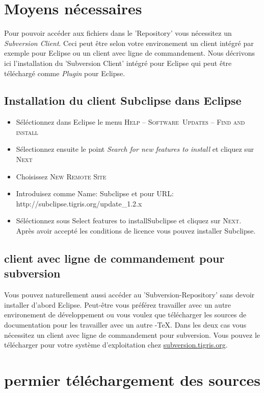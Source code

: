 \section{Moyens nécessaires}
Pour pouvoir accéder aux fichiers dans le 'Repository' vous nécessitez un \textit{Subversion Client}. Ceci peut être selon votre environement un client intégré par exemple pour Eclipse ou un client avec ligne de commandement. Nous décrivons ici l'installation du 'Subversion Client' intégré pour Eclipse qui peut être téléchargé comme \textit{Plugin} pour Eclipse.
\subsection{Installation du client Subclipse dans Eclipse}
\label{subclipse}
\begin{itemize}
  \item Séléctionnez dans Eclipse le menu \textsc{Help -- Software~Updates -- Find
  and install}
  \item Sélectionnez ensuite le point \textit{Search for new features to install} et cliquez sur \textsc{Next}
  \item Choisissez \textsc{New Remote Site}
  \item Introduisez comme \glq Name\grq : Sub\-clipse et pour \glq URL\grq:
  http://subclipse.tigris.org/update\_1.2.x
  \item Séléctionnez sous \glqq Select features to install\grqq Subclipse et cliquez sur \textsc{Next}. Après avoir accepté les conditions de licence vous pouvez installer Subclipse.

\end{itemize}
\subsection{client avec ligne de commandement pour subversion}
\label{subversionclient}
Vous pouvez naturellement aussi accéder au 'Subversion-Repository' sans devoir installer d'abord Eclipse. Peut-être vous préférez travailler avec un autre environement de développement ou vous voulez que télécharger les sources de documentation pour les travailler avec un autre \Instrument-TeX. Dans les deux cas vous nécessitez un client avec ligne de commandement pour subversion. Vous pouvez le télécharger pour votre système d'exploitation chez \href{http://subversion.tigris.org}{subversion.tigris.org}.

\section{permier téléchargement des sources}
